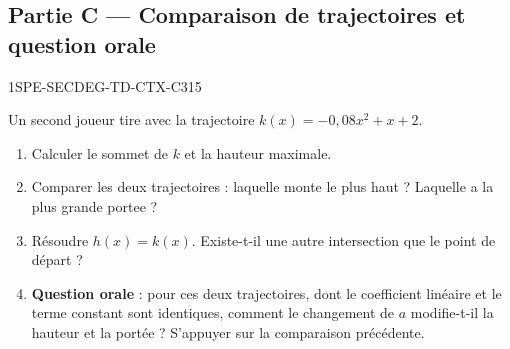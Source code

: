 \bigskip

\subsection*{Partie C — Comparaison de trajectoires et question orale}

\begin{exercice}{1SPE-SECDEG-TD-CTX-C}{3}{15}

Un second joueur tire avec la trajectoire $k(x) = -0{,}08x^2 + x + 2$.

\begin{enumerate}
  \item Calculer le sommet de $k$ et la hauteur maximale.
  \item Comparer les deux trajectoires : laquelle monte le plus haut ? Laquelle a la plus grande portee ?
  \item Résoudre $h(x) = k(x)$. Existe-t-il une autre intersection que le point de départ ?
  \item \textbf{Question orale} : pour ces deux trajectoires, dont le coefficient
    linéaire et le terme constant sont identiques, comment le changement de $a$
    modifie-t-il la hauteur et la portée ? S'appuyer sur la comparaison précédente.
\end{enumerate}
\end{exercice}


